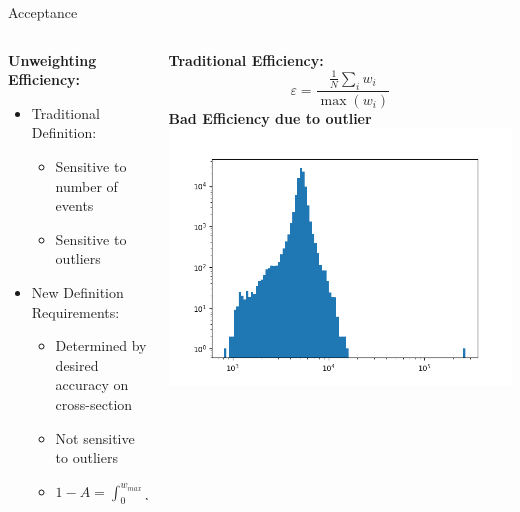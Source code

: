 \documentclass{beamer}
\begin{document}
\begin{frame}{Acceptance}

\begin{columns}
    \begin{column}{5cm}
    \textbf{Unweighting Efficiency:}
    \begin{itemize}
        \item Traditional Definition:
        \begin{itemize}
            \item Sensitive to number of events
            \item Sensitive to outliers
        \end{itemize}
        \item New Definition Requirements:
        \begin{itemize}
            \item Determined by desired accuracy on cross-section
            \item Not sensitive to outliers
            \item $1-A = \int_0^{w_{max}} f(w) dw$
        \end{itemize}
    \end{itemize}
    \end{column}
    \begin{column}{5cm}
        \textbf{Traditional Efficiency:}
        \begin{equation*}
            \varepsilon = \frac{\frac{1}{N} \sum_i w_i}{\max(w_i)}
        \end{equation*}
        \textbf{Bad Efficiency due to outlier}
        \includegraphics[width=\textwidth]{figs/efficiency_badexample.png}
    \end{column}
\end{columns}
    
\end{frame}
\end{document}
